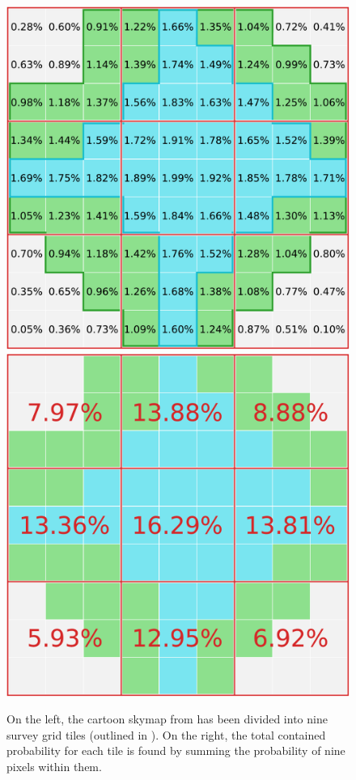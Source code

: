 \begin{colsection}
\begin{figure}[t]
    \begin{center}
        \includegraphics[width=0.46\linewidth]{images/sim/sim_skymap_pix_probs.pdf}
        \includegraphics[width=0.46\linewidth]{images/sim/sim_skymap_tile_probs.pdf}
    \end{center}
    \caption[Mapping a 2D probability skymap onto grid tiles]{
        On the left, the cartoon skymap from  has been divided into nine survey grid tiles (outlined in ). On the right, the total contained probability for each tile is found by summing the probability of nine pixels within them.
    }\label{fig:sim_skymap_tiles}
\end{figure}

\newpage

\end{colsection}


